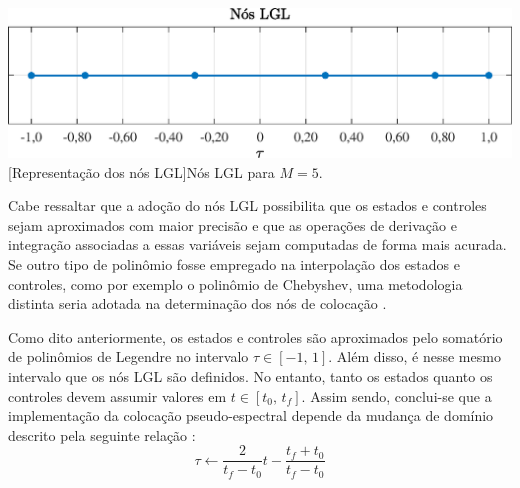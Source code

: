\noindent	
\begin{minipage}{\textwidth}
	\vspace{\onelineskip}
	\centering
	\includegraphics[width=1\linewidth]{fig/revisao/nosLGL}
	[Representação dos nós LGL]{Nós LGL para $ M = 5 $.}
	\label{fig:revisao:nosLGL}
	\vspace{\onelineskip}
\end{minipage}

Cabe ressaltar que a adoção do nós LGL possibilita que os estados e controles sejam aproximados com maior precisão e que as operações de derivação e integração associadas a essas variáveis sejam computadas de forma mais acurada. Se outro tipo de polinômio fosse empregado na interpolação dos estados e controles, como por exemplo o polinômio de Chebyshev, uma metodologia distinta seria adotada na determinação dos nós de colocação \cite{becerra_tutorial_2010}.

Como dito anteriormente, os estados e controles são aproximados pelo somatório de polinômios de Legendre no intervalo $ \tau \in [-1, \, 1] $. Além disso, é nesse mesmo intervalo que os nós LGL são definidos. No entanto, tanto os estados quanto os controles devem assumir valores em $ t \in [t_0, \, t_f] $. Assim sendo, conclui-se que a implementação da colocação pseudo-espectral depende da mudança de domínio descrito pela seguinte relação \cite{becerra_tutorial_2010}:
%
\begin{equation}
	\label{eq:revisao:mudancaDominioPseudoEspectral}
	\tau \leftarrow \frac{2}{t_f - t_0} t - \frac{t_f + t_0}{t_f - t_0}
\end{equation}
%

